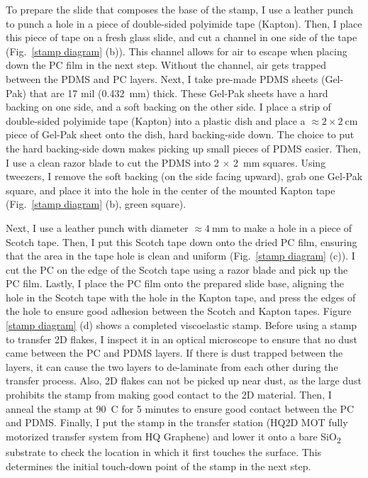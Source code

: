 \documentclass{beavtex_dub_edit}
\begin{document}
To prepare the slide that composes the base of the stamp, I use a leather punch to punch a hole in a piece of double-sided polyimide tape (Kapton). Then, I place this piece of tape on a fresh glass slide, and cut a channel in one side of the tape (Fig.\ \ref{stamp diagram} (b)). This channel allows for air to escape when placing down the PC film in the next step. Without the channel, air gets trapped between the PDMS and PC layers. Next, I take pre-made PDMS sheets (Gel-Pak) that are 17 mil (\SI{0.432}{\milli\meter}) thick. These Gel-Pak sheets have a hard backing on one side, and a soft backing on the other side. I place a strip of double-sided polyimide tape (Kapton) into a plastic dish and place a $\approx 2 \times \SI{2}{\centi\meter}$ piece of Gel-Pak sheet onto the dish, hard backing-side down. The choice to put the hard backing-side down makes picking up small pieces of PDMS easier. Then, I use a clean razor blade to cut the PDMS into 2 $\times$ \SI{2}{mm} squares. Using tweezers, I remove the soft backing (on the side facing upward), grab one Gel-Pak square, and place it into the hole in the center of the mounted Kapton tape (Fig.\ \ref{stamp diagram} (b), green square).

Next, I use a leather punch with diameter $\approx  \SI{4}{\milli\meter}$ to make a hole in a piece of Scotch tape. Then, I put this Scotch tape down onto the dried PC film, ensuring that the area in the tape hole is clean and uniform (Fig.\ \ref{stamp diagram} (c)). I cut the PC on the edge of the Scotch tape using a razor blade and pick up the PC film. Lastly, I place the PC film onto the prepared slide base, aligning the hole in the Scotch tape with the hole in the Kapton tape, and press the edges of the hole to ensure good adhesion between the Scotch and Kapton tapes. Figure \ref{stamp diagram} (d) shows a completed viscoelastic stamp. Before using a stamp to transfer 2D flakes, I inspect it in an optical microscope to ensure that no dust came between the PC and PDMS layers. If there is dust trapped between the layers, it can cause the two layers to de-laminate from each other during the transfer process. Also, 2D flakes can not be picked up near dust, as the large dust prohibits the stamp from making good contact to the 2D material. Then, I anneal the stamp at \SI{90}{C} for 5 minutes to ensure good contact between the PC and PDMS. Finally, I put the stamp in the transfer station (HQ2D MOT fully motorized transfer system from HQ Graphene) and lower it onto a bare SiO\textsubscript{2} substrate to check the location in which it first touches the surface. This determines the initial touch-down point of the stamp in the next step.
\end{document}
